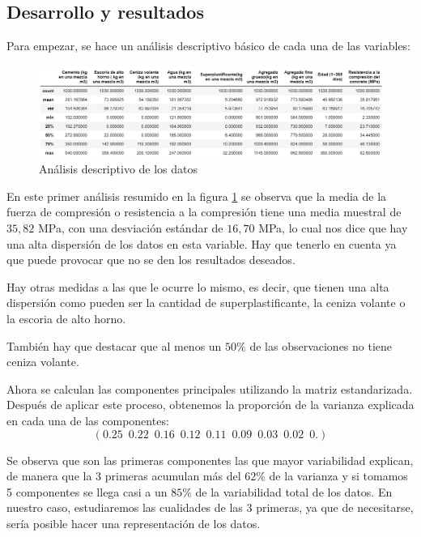 \subsection*{Desarrollo y resultados}

\noindent Para empezar, se hace un análisis descriptivo básico de cada una de las variables:
\begin{figure}[h]
  \centering
  \includegraphics[scale=0.47]{Documentos Extra/Imagenes/Resumen_Basicos.png}
  \caption{Análisis descriptivo de los datos}
  \label{fig:resumen_basicos}
\end{figure}

\noindent En este primer análisis resumido en la figura \ref{fig:resumen_basicos} se observa que la media de la fuerza de compresión o resistencia a la compresión tiene una media muestral de $35,82$ MPa, con una desviación estándar de $16,70$ MPa, lo cual nos dice que hay una alta dispersión de los datos en esta variable. Hay que tenerlo en cuenta ya que puede provocar que no se den los resultados deseados. 

\noindent Hay otras medidas a las que le ocurre lo mismo, es decir, que tienen una alta dispersión como pueden ser la cantidad de superplastificante, la ceniza volante o la escoria de alto horno. 

\noindent También hay que destacar que al menos un $50\%$ de las observaciones no tiene ceniza volante.  

\noindent Ahora se calculan las componentes principales utilizando la matriz estandarizada. Después de aplicar este proceso, obtenemos la proporción de la varianza explicada en cada una de las componentes:
\begin{equation*}
(0.25 \enspace 0.22 \enspace 0.16 \enspace 0.12 \enspace 0.11 \enspace 0.09 \enspace 0.03 \enspace 0.02 \enspace 0.  )
\end{equation*}

\noindent Se observa que son las primeras componentes las que mayor variabilidad explican, de manera que la 3 primeras acumulan más del $62\%$ de la varianza y si tomamos 5 componentes se llega casi a un $85\%$ de la variabilidad total de los datos. En nuestro caso, estudiaremos las cualidades de las 3 primeras, ya que de necesitarse, sería posible hacer una representación de los datos. 

